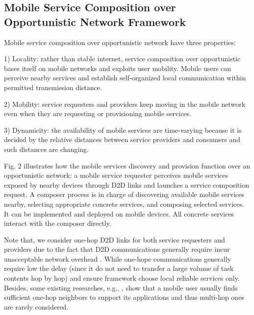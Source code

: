 \documentclass[journal]{IEEEtran}
\begin{document}
\subsection{Mobile Service Composition over Opportunistic Network Framework}

Mobile service composition over opportunistic network have three properties:

1) Locality: rather than stable internet, service composition over opportunistic bases itself on mobile networks and exploits user mobility. Mobile users can perceive nearby services and establish self-organized local communication within permitted transmission distance.

2) Mobility: service requesters and providers keep moving in the mobile network even when they are requesting or provisioning mobile services.

3) Dynamicity: the availability of mobile services are time-varying because it is decided by the relative distances between service providers and consumers and such distances are changing.

Fig. 2 illustrates how the mobile services discovery and provision function over an opportunistic network: a mobile service requester perceives mobile services exposed by nearby devices through D2D links and launches a service composition request. A composer process is in charge of discovering available mobile services nearby, selecting appropriate concrete services, and composing selected services. It can be implemented and deployed on mobile devices. All concrete services interact with the composer directly.

Note that, we consider one-hop D2D links for both service requesters and providers due to the fact that D2D communications generally require incur unacceptable network overhead \cite{li2014can}. While one-hope communications generally require low the delay (since it do not need to transfer a large volume of task contents hop by hop) and ensure framework choose local reliable services only.
Besides, some existing researches, e.g., \cite{chang2015progressive, tuncay2013participant, wu2013homing, jiang2016exploiting, liu2013exploring}, show that a mobile user usually finds sufficient one-hop neighbors to support its applications and thus multi-hop ones are rarely considered.

\end{document}
